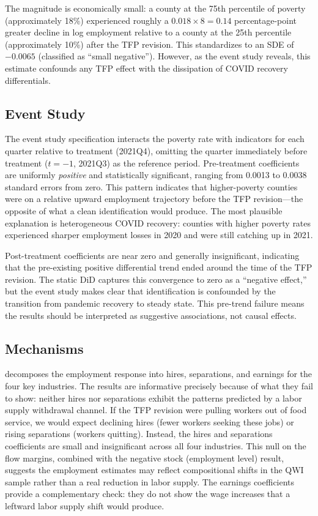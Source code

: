 \documentclass[12pt]{article}
\begin{document}
The magnitude is economically small: a county at the 75th percentile of poverty (approximately 18\%) experienced roughly a $0.018 \times 8 = 0.14$ percentage-point greater decline in log employment relative to a county at the 25th percentile (approximately 10\%) after the TFP revision. This standardizes to an SDE of $-0.0065$ (classified as ``small negative''). However, as the event study reveals, this estimate confounds any TFP effect with the dissipation of COVID recovery differentials.

\subsection{Event Study}

The event study specification interacts the poverty rate with indicators for each quarter relative to treatment (2021Q4), omitting the quarter immediately before treatment ($t = -1$, 2021Q3) as the reference period. Pre-treatment coefficients are uniformly \textit{positive} and statistically significant, ranging from 0.0013 to 0.0038 standard errors from zero. This pattern indicates that higher-poverty counties were on a relative upward employment trajectory before the TFP revision---the opposite of what a clean identification would produce. The most plausible explanation is heterogeneous COVID recovery: counties with higher poverty rates experienced sharper employment losses in 2020 and were still catching up in 2021.

Post-treatment coefficients are near zero and generally insignificant, indicating that the pre-existing positive differential trend ended around the time of the TFP revision. The static DiD captures this convergence to zero as a ``negative effect,'' but the event study makes clear that identification is confounded by the transition from pandemic recovery to steady state. This pre-trend failure means the results should be interpreted as suggestive associations, not causal effects.

\subsection{Mechanisms}



 decomposes the employment response into hires, separations, and earnings for the four key industries. The results are informative precisely because of what they fail to show: neither hires nor separations exhibit the patterns predicted by a labor supply withdrawal channel. If the TFP revision were pulling workers out of food service, we would expect declining hires (fewer workers seeking these jobs) or rising separations (workers quitting). Instead, the hires and separations coefficients are small and insignificant across all four industries. This null on the flow margins, combined with the negative stock (employment level) result, suggests the employment estimates may reflect compositional shifts in the QWI sample rather than a real reduction in labor supply. The earnings coefficients provide a complementary check: they do not show the wage increases that a leftward labor supply shift would produce.
\end{document}
